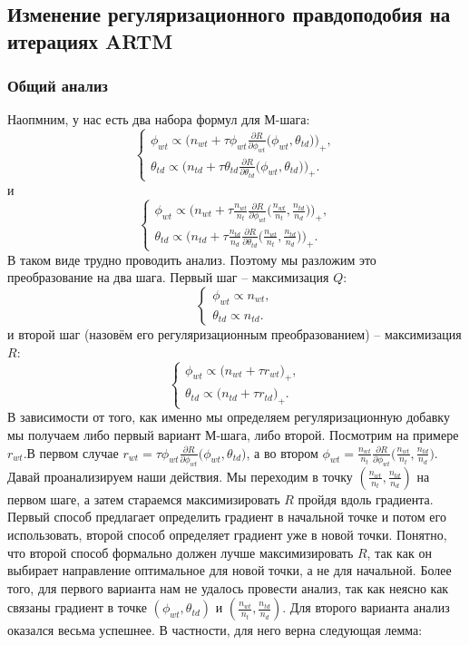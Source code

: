 \documentclass[12pt]{article}
\begin{document}
	\subsection{Изменение регуляризационного правдоподобия на итерациях ARTM}
	\subsubsection{Общий анализ}
Наопмним, у нас есть два набора формул для М-шага:
\[
\left\{
	\begin{aligned}
		\phi_{wt} \propto \bigg( n_{wt} + \tau\phi_{wt} \frac{\partial{R}}{\partial{\phi_{wt}}} \big( \phi_{wt}, \theta_{td}\big) \bigg)_{+},\\
		\theta_{td} \propto \bigg( n_{td} + \tau\theta_{td} \frac{\partial{R}}{\partial{\theta_{td}}} \big( \phi_{wt}, \theta_{td}\big) \bigg)_{+}.
	\end{aligned}
\right.
\]
и
\[
\left\{
	\begin{aligned}
		\phi_{wt} \propto \bigg( n_{wt} + \tau \frac{n_{wt}}{n_t} \frac{\partial{R}}{\partial{\phi_{wt}}} \big(\frac{n_{wt}}{n_t}, \frac{n_{td}}{n_d}\big) \bigg)_{+},\\
		\theta_{td} \propto \bigg(n_{td} + \tau \frac{n_{td}}{n_d} \frac{\partial{R}}{\partial{\theta_{td}}} \big(\frac{n_{wt}}{n_t}, \frac{n_{td}}{n_d}\big) \bigg)_{+}.
	\end{aligned}
\right.
\]
В таком виде трудно проводить анализ. Поэтому мы разложим это преобразование на два шага. Первый шаг -- максимизация $Q$:
\[
\left\{
	\begin{aligned}
		\phi_{wt} \propto n_{wt},\\
		\theta_{td} \propto n_{td} .
	\end{aligned}
\right.
\]
и второй шаг (назовём его регуляризационным преобразованием) -- максимизация $R$:
\[
\left\{
	\begin{aligned}
		\phi_{wt} \propto \bigg( n_{wt} + \tau r_{wt}\bigg)_{+},\\
		\theta_{td} \propto \bigg( n_{td} + \tau r_{td}\bigg)_{+}.
	\end{aligned}
\right.
\]
В зависимости от того, как именно мы определяем регуляризационную добавку мы получаем либо первый вариант М-шага, либо второй. Посмотрим на примере $r_{wt}. $В первом случае $r_{wt} = \tau\phi_{wt} \frac{\partial{R}}{\partial{\phi_{wt}}} \big( \phi_{wt}, \theta_{td}\big)$, а во втором $\phi_{wt} = \frac{n_{wt}}{n_t} \frac{\partial{R}}{\partial{\phi_{wt}}} \big(\frac{n_{wt}}{n_t}, \frac{n_{td}}{n_d}\big)$. Давай проанализируем 
наши действия. Мы переходим в точку $(\frac{n_{wt}}{n_t}, \frac{n_{td}}{n_d})$ на первом шаге, а затем стараемся максимизировать $R$ пройдя вдоль градиента. Первый способ предлагает определить градиент в начальной точке и потом его использовать, второй способ определяет градиент уже в новой точки. Понятно, что второй способ формально должен лучше максимизировать $R$, так как он выбирает направление оптимальное для новой точки, а не для начальной. Более того, для первого варианта нам не удалось провести анализ, так как неясно как связаны градиент в точке $(\phi_{wt}, \theta_{td})$ и $(\frac{n_{wt}}{n_t}, \frac{n_{td}}{n_d})$. Для второго варианта анализ оказался весьма успешнее. В частности, для него верна следующая лемма:
\end{document}

